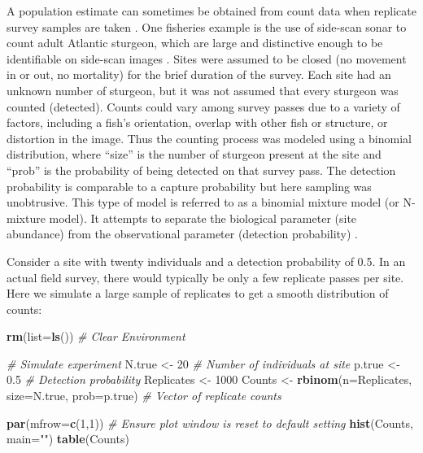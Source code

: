 \documentclass[
]{krantz}
\makeatletter
\newenvironment{Shaded}{\begin{snugshade}}{\end{snugshade}}
\newcommand{\AttributeTok}[1]{\textcolor[rgb]{0.27,0.27,0.27}{#1}}
\newcommand{\CommentTok}[1]{\textcolor[rgb]{0.37,0.37,0.37}{\textit{#1}}}
\newcommand{\DecValTok}[1]{\textcolor[rgb]{0.06,0.06,0.06}{#1}}
\newcommand{\FloatTok}[1]{\textcolor[rgb]{0.06,0.06,0.06}{#1}}
\newcommand{\FunctionTok}[1]{\textcolor[rgb]{0.27,0.27,0.27}{\textbf{#1}}}
\newcommand{\NormalTok}[1]{#1}
\newcommand{\OtherTok}[1]{\textcolor[rgb]{0.37,0.37,0.37}{#1}}
\newcommand{\StringTok}[1]{\textcolor[rgb]{0.5,0.5,0.5}{#1}}
\newenvironment{kframe}{%
\medskip{}
\setlength{\fboxsep}{.8em}
 \def\at@end@of@kframe{}%
 \ifinner\ifhmode%
  \def\at@end@of@kframe{\end{minipage}}%
  \begin{minipage}{\columnwidth}%
 \fi\fi%
 \def\FrameCommand##1{\hskip\@totalleftmargin \hskip-\fboxsep
 \colorbox{shadecolor}{##1}\hskip-\fboxsep
     \hskip-\linewidth \hskip-\@totalleftmargin \hskip\columnwidth}%
 \MakeFramed {\advance\hsize-\width
   \@totalleftmargin\z@ \linewidth\hsize
   \@setminipage}}%
 {\par\unskip\endMakeFramed%
 \at@end@of@kframe}
\renewenvironment{Shaded}{\begin{kframe}}{\end{kframe}}
\makeatother
\begin{document}
A population estimate can sometimes be obtained from count data when replicate survey samples are taken \citep{royle_2004, kéry.schaub_2012}. One fisheries example is the use of side-scan sonar to count adult Atlantic sturgeon, which are large and distinctive enough to be identifiable on side-scan images \citep{flowers.hightower_2013, flowers.hightower_2015}. Sites were assumed to be closed (no movement in or out, no mortality) for the brief duration of the survey. Each site had an unknown number of sturgeon, but it was not assumed that every sturgeon was counted (detected). Counts could vary among survey passes due to a variety of factors, including a fish's orientation, overlap with other fish or structure, or distortion in the image. Thus the counting process was modeled using a binomial distribution, where ``size'' is the number of sturgeon present at the site and ``prob'' is the probability of being detected on that survey pass. The detection probability is comparable to a capture probability but here sampling was unobtrusive. This type of model is referred to as a binomial mixture model (or N-mixture model). It attempts to separate the biological parameter (site abundance) from the observational parameter (detection probability) \citep{royle_2004, kéry.schaub_2012}.

Consider a site with twenty individuals and a detection probability of 0.5. In an actual field survey, there would typically be only a few replicate passes per site. Here we simulate a large sample of replicates to get a smooth distribution of counts:

\begin{Shaded}
\begin{Highlighting}[]
\FunctionTok{rm}\NormalTok{(}\AttributeTok{list=}\FunctionTok{ls}\NormalTok{()) }\CommentTok{\# Clear Environment}

\CommentTok{\# Simulate experiment}
\NormalTok{N.true }\OtherTok{\textless{}{-}} \DecValTok{20}  \CommentTok{\# Number of individuals at site}
\NormalTok{p.true }\OtherTok{\textless{}{-}} \FloatTok{0.5} \CommentTok{\# Detection probability}
\NormalTok{Replicates }\OtherTok{\textless{}{-}} \DecValTok{1000}
\NormalTok{Counts }\OtherTok{\textless{}{-}} \FunctionTok{rbinom}\NormalTok{(}\AttributeTok{n=}\NormalTok{Replicates, }\AttributeTok{size=}\NormalTok{N.true, }\AttributeTok{prob=}\NormalTok{p.true)}
  \CommentTok{\# Vector of replicate counts}

\FunctionTok{par}\NormalTok{(}\AttributeTok{mfrow=}\FunctionTok{c}\NormalTok{(}\DecValTok{1}\NormalTok{,}\DecValTok{1}\NormalTok{)) }\CommentTok{\# Ensure plot window is reset to default setting}
\FunctionTok{hist}\NormalTok{(Counts, }\AttributeTok{main=}\StringTok{""}\NormalTok{)}
\FunctionTok{table}\NormalTok{(Counts)}
\end{Highlighting}
\end{Shaded}
\end{document}
